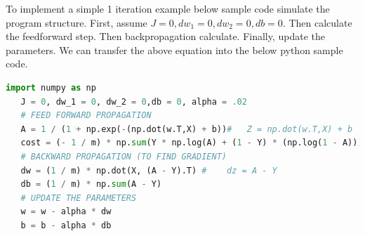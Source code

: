 To implement a simple 1 iteration example below sample code simulate the program structure. First,  assume $J = 0, dw_1 = 0, dw_2 = 0,db = 0$. Then calculate the feedforward step. Then backpropagation calculate. Finally, update the parameters. We can transfer the above equation into the below python sample code. 
 \begin{lstlisting}[language=Python]
   import numpy as np
   J = 0, dw_1 = 0, dw_2 = 0,db = 0, alpha = .02
   # FEED FORWARD PROPAGATION
   A = 1 / (1 + np.exp(-(np.dot(w.T,X) + b))#   Z = np.dot(w.T,X) + b
   cost = (- 1 / m) * np.sum(Y * np.log(A) + (1 - Y) * (np.log(1 - A)))
   # BACKWARD PROPAGATION (TO FIND GRADIENT)
   dw = (1 / m) * np.dot(X, (A - Y).T) #    dz = A - Y
   db = (1 / m) * np.sum(A - Y)
   # UPDATE THE PARAMETERS
   w = w - alpha * dw
   b = b - alpha * db
\end{lstlisting}


 








